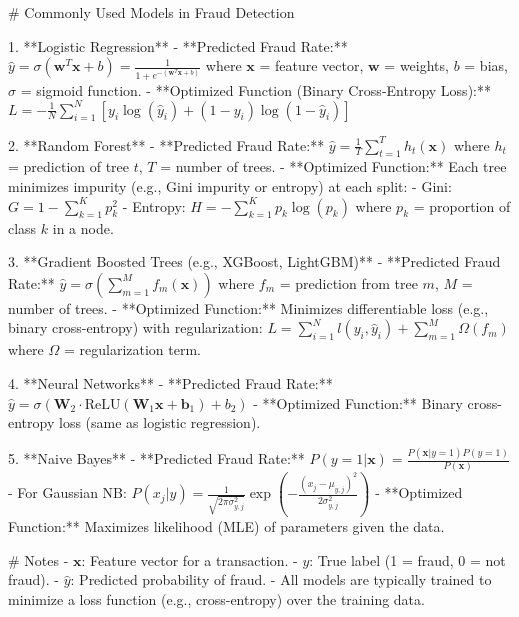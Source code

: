 # Commonly Used Models in Fraud Detection

1. **Logistic Regression**
    - **Predicted Fraud Rate:**  
      \( \hat{y} = \sigma(\mathbf{w}^T \mathbf{x} + b) = \frac{1}{1 + e^{-(\mathbf{w}^T \mathbf{x} + b)}} \)  
      where \(\mathbf{x}\) = feature vector, \(\mathbf{w}\) = weights, \(b\) = bias, \(\sigma\) = sigmoid function.
    - **Optimized Function (Binary Cross-Entropy Loss):**  
      \( L = -\frac{1}{N} \sum_{i=1}^N [y_i \log(\hat{y}_i) + (1 - y_i) \log(1 - \hat{y}_i)] \)

2. **Random Forest**
    - **Predicted Fraud Rate:**  
      \( \hat{y} = \frac{1}{T} \sum_{t=1}^T h_t(\mathbf{x}) \)  
      where \(h_t\) = prediction of tree \(t\), \(T\) = number of trees.
    - **Optimized Function:**  
      Each tree minimizes impurity (e.g., Gini impurity or entropy) at each split:
      - Gini: \( G = 1 - \sum_{k=1}^K p_k^2 \)
      - Entropy: \( H = -\sum_{k=1}^K p_k \log(p_k) \)
      where \(p_k\) = proportion of class \(k\) in a node.

3. **Gradient Boosted Trees (e.g., XGBoost, LightGBM)**
    - **Predicted Fraud Rate:**  
      \( \hat{y} = \sigma\left(\sum_{m=1}^M f_m(\mathbf{x})\right) \)  
      where \(f_m\) = prediction from tree \(m\), \(M\) = number of trees.
    - **Optimized Function:**  
      Minimizes differentiable loss (e.g., binary cross-entropy) with regularization:
      \( L = \sum_{i=1}^N l(y_i, \hat{y}_i) + \sum_{m=1}^M \Omega(f_m) \)
      where \(\Omega\) = regularization term.

4. **Neural Networks**
    - **Predicted Fraud Rate:**  
      \( \hat{y} = \sigma(\mathbf{W}_2 \cdot \text{ReLU}(\mathbf{W}_1 \mathbf{x} + \mathbf{b}_1) + b_2) \)
    - **Optimized Function:**  
      Binary cross-entropy loss (same as logistic regression).

5. **Naive Bayes**
    - **Predicted Fraud Rate:**  
      \( P(y=1|\mathbf{x}) = \frac{P(\mathbf{x}|y=1)P(y=1)}{P(\mathbf{x})} \)
      - For Gaussian NB:  
         \( P(x_j|y) = \frac{1}{\sqrt{2\pi\sigma_{y,j}^2}} \exp\left(-\frac{(x_j - \mu_{y,j})^2}{2\sigma_{y,j}^2}\right) \)
    - **Optimized Function:**  
      Maximizes likelihood (MLE) of parameters given the data.

# Notes
- \(\mathbf{x}\): Feature vector for a transaction.
- \(y\): True label (1 = fraud, 0 = not fraud).
- \(\hat{y}\): Predicted probability of fraud.
- All models are typically trained to minimize a loss function (e.g., cross-entropy) over the training data.